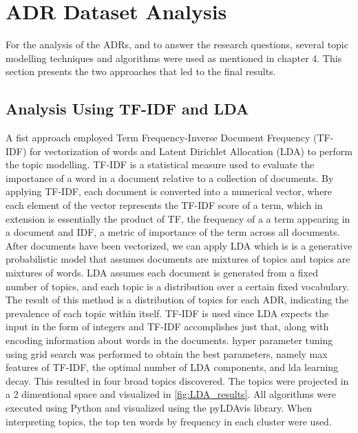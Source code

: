 \chapter{ADR Dataset Analysis}
    For the analysis of the ADRs, and to answer the research questions, several topic modelling techniques and algorithms were used as mentioned in chapter 4. This section presents the two approaches that led to the final results.
        
    \section{Analysis Using TF-IDF and LDA}
        A fist approach employed Term Frequency-Inverse Document Frequency (TF-IDF) for vectorization of words and Latent Dirichlet Allocation (LDA) to perform the topic modelling. TF-IDF is a statistical measure used to evaluate the importance of a word in a document relative to a collection of documents. By applying TF-IDF, each document is converted into a numerical vector, where each element of the vector represents the TF-IDF score of a term, which in extension is essentially the product of TF, the frequency of a a term appearing in a document and IDF, a metric of importance of the term across all documents. After documents have been vectorized, we can apply LDA which is is a generative probabilistic model that assumes documents are mixtures of topics and topics are mixtures of words\cite{LDA_paper}. LDA assumes each document is generated from a fixed number of topics, and each topic is a distribution over a certain fixed vocabulary. The result of this method is a distribution of topics for each ADR, indicating the prevalence of each topic within itself. TF-IDF is used since LDA expects the input in the form of integers and TF-IDF accomplishes just that, along with encoding information about words in the documents. hyper parameter tuning using grid search was performed to obtain the best parameters, namely max features of TF-IDF, the optimal number of LDA components, and lda learning decay. This resulted in four broad topics discovered. The topics were projected in a 2 dimentional space and visualized in \ref{fig:LDA_results}. All algorithms were executed using Python and visualized using the pyLDAvis library. When interpreting topics, the top ten words by frequency in each cluster were used.

